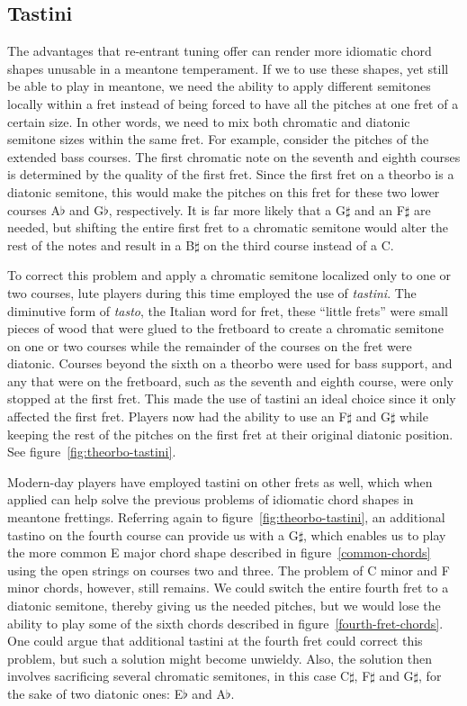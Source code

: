 \subsection{Tastini}

The advantages that re-entrant tuning offer can render more idiomatic chord
shapes unusable in a meantone temperament.  If we to use these shapes, yet still
be able to play in meantone, we need the ability to apply different semitones
locally within a fret instead of being forced to have all the pitches at one
fret of a certain size. In other words, we need to mix both chromatic and
diatonic semitone sizes within the same fret.  For example, consider the pitches
of the extended bass courses. The first chromatic note on the seventh and eighth
courses is determined by the quality of the first fret.  Since the first fret on
a theorbo is a diatonic semitone, this would make the pitches on this fret for
these two lower courses A$\flat$ and G$\flat$, respectively.  It is far more
likely that a G$\sharp$ and an F$\sharp$ are needed, but shifting the entire
first fret to a chromatic semitone would alter the rest of the notes and result
in a B$\sharp$ on the third course instead of a C.

To correct this problem and apply a chromatic semitone localized only to one or two
courses, lute players during this time employed the use of \textit{tastini}.  The
diminutive form of \textit{tasto}, the Italian word for fret, these ``little frets'' were
small pieces of wood that were glued to the fretboard to create a chromatic semitone on
one or two courses while the remainder of the courses on the fret were diatonic.  Courses
beyond the sixth on a theorbo were used for bass support, and any that were on the
fretboard, such as the seventh and eighth course, were only stopped at the first fret.
This made the use of tastini an ideal choice since it only affected the first fret. Players now had
the ability to use an F$\sharp$ and G$\sharp$ while keeping the rest of the pitches on the
first fret at their original diatonic position. See figure~\ref{fig:theorbo-tastini}.



Modern-day players have employed tastini on other frets as well, which when applied
can help solve the previous problems of idiomatic chord shapes in meantone frettings.
Referring again to figure~\ref{fig:theorbo-tastini}, an additional tastino on the
fourth course can provide us with a G$\sharp$, which enables us to play the more
common E major chord shape described in figure~\ref{common-chords} using the open
strings on courses two and three.  The problem of C minor and F minor chords, however,
still remains.  We could switch the entire fourth fret to a diatonic semitone, thereby giving
us the needed pitches, but we would lose the ability to play some of the
sixth chords described in figure~\ref{fourth-fret-chords}.  One could argue
that additional tastini at the fourth fret could correct this problem, but such a solution
might become unwieldy.  Also, the solution then involves sacrificing several chromatic
semitones, in this case C$\sharp$, F$\sharp$ and G$\sharp$, for the sake of two diatonic
ones: E$\flat$ and A$\flat$.

